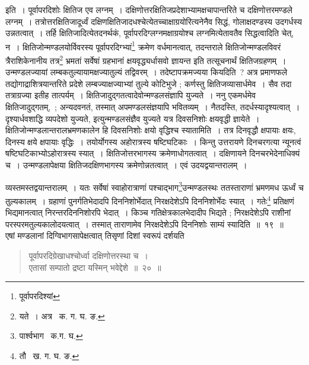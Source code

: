 \documentclass[11pt, openany]{book}
\begin{document}
\indent इति~। पूर्वापरदिशोः क्षितिज एव लग्नम्~। दक्षिणोत्तरक्षितिजप्रदेशाभ्यामक्षचापान्तरिते च दक्षिणोत्तरमण्डले लग्नम्~। तत्रोत्तरक्षितिजादूर्ध्वं दक्षिणक्षितिजादधश्चेत्येतच्चाक्षाग्रयोरित्यनेनैव सिद्धं, गोलाक्षदण्डस्य उदगर्धस्य उन्नतत्वात्~। तर्हि 
क्षितिजादित्येतदनर्थकं, पूर्वापरदिग्लग्नमक्षाग्रयोश्च लग्नमित्येतावतैव सिद्धत्वादिति चेत्, न~। क्षितिजोन्मण्डलयोर्विवरस्य पूर्वापरदिग्भ्यां\renewcommand{\thefootnote}{१}\footnote{पूर्वापरदिश्यां} क्रमेण 
वर्धमानत्वात्, तदन्तराले क्षितिजोन्मण्डलविवरं त्रैराशिकेनानीय तत्र\renewcommand{\thefootnote}{२}\footnote{यते~। अत्र \textendash\ क. ग. घ. ङ.} भ्रमतां सर्वेषां ग्रहभानां क्षयवृद्ध्यर्धासवो ज्ञायन्त इति तत्सूचनार्थं क्षितिजग्रहणम्~। उन्मण्डलज्यायां लम्बकतुल्यायामक्षज्यातुल्यं तद्विवरम्~। 
तदेष्टापक्रमज्यया कियदिति~? अत्र प्रमाणफले तद्योगाद्राशित्रयान्तरिते प्रदेशे लम्बज्याक्षज्याभ्यां तुल्ये कोटिभुजे ; कर्णस्तु क्षितिजव्यासार्धमेव~। सैव तदा तत्राग्रज्या इतीह तात्पर्यम्~। क्षितिजादुद्गतत्वादेवोन्मण्डलसंज्ञापि युज्यते~। ननु एकमर्धमेव क्षितिजादुद्गतम्,~; अन्यदवनतं, 
तस्मात् अपमण्डलसंज्ञयापि भवितव्यम्~। नैतदस्ति, तदर्धस्यादृश्यत्वात्~। दृश्यार्धवशाद्धि व्यपदेशो युज्यते, इत्युन्मण्डलसंज्ञैव युज्यते यत्र दिवसनिशोः क्षयवृद्धी ज्ञायेते~। क्षितिजोन्मण्डलान्तरालभ्रमणकालेन हि दिवसनिशोः क्षयो 
वृद्धिश्च स्यातामिति~। तत्र दिनवृद्धौ क्षपायाः क्षयः, दिनस्य क्षये क्षपायाः वृद्धिः~। तयोर्योगस्य अहोरात्रस्य षष्टिघटिकाः~। 
किन्तु उत्तरायणे दिनचरगत्या न्यूनत्वं षष्टिघटिकाभ्योऽहोरात्रस्य स्यात्~। क्षितिजोत्तरभागस्य क्रमेणाधोगतत्वात्~। दक्षिणायने दिनचरभेदेनाधिक्यं च~। उन्मण्डलापेक्षया क्षितिजदक्षिणभागस्य क्रमेणोन्नतत्वात्~। एवं उदयद्वयान्तरालम्~। 

\newpage

\noindent व्यस्तमस्तद्वयान्तरालम्~। यतः सर्वेषां स्वाहोरात्राणां पश्चाद्भाग\renewcommand{\thefootnote}{१}\footnote{पार्श्वभाग \textendash\ क.ग. घ.}उन्मण्डलस्थः ततस्ताराणां भ्रमणमध ऊर्ध्वं च तुल्यकालम्~। ग्रहाणां पुनर्गतिभेदादपि दिननिशोर्भेदात् निरक्षदेशेऽपि दिननिशोर्भेदः स्यात्~। गतेः\renewcommand{\thefootnote}{२}\footnote{तौ \textendash\ ख. ग. घ. ङ.} प्रतिक्षणं भिद्यमानत्वात् निरन्तरदिननिशोरपि भेदात्~। किञ्च गतिक्षेत्रकालभेदादीप भिद्यते ; निरक्षदेशेऽपि राशीनां परस्परमतुल्यकालोदयत्वात्~। तस्मात् ताराणामेव निरक्षदेशेऽपि दिननिशोः साम्यं स्यादिति~॥~१९~॥ \\

\indent एषां मण्डलानां दिग्विभागसापेक्षत्वात् तिसृणां दिशां स्वरूपं दर्शयति\textendash 

\begin{quote}
{\ab पूर्वापरदिग्रेखाधश्चोर्ध्वा दक्षिणोत्तरस्था च~।\\
 एतासां सम्पातो द्रष्टा यस्मिन् भवेद्देशे~॥~२०~॥} 
\end{quote}
\end{document}
